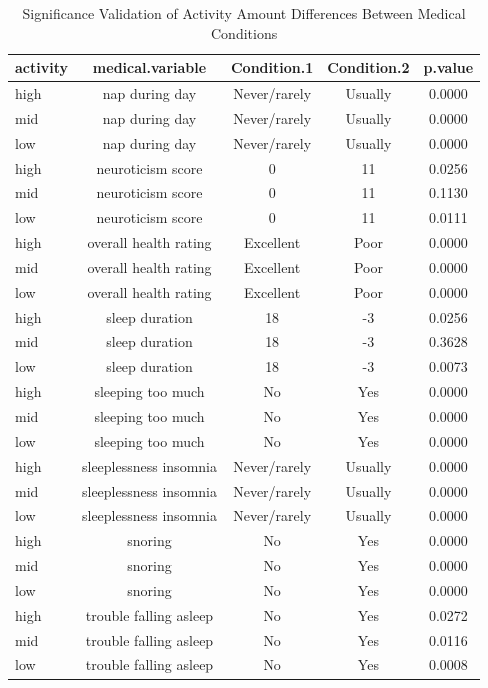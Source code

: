 \documentclass[12pt]{article}
\begin{document}
\begin{longtable}[t]{>{\centering\arraybackslash}p{2cm}cccc}
\caption{\label{tab:unnamed-chunk-8}Significance Validation of Activity Amount Differences Between Medical Conditions}\\
\toprule
activity & medical.variable & Condition.1 & Condition.2 & p.value\\
\midrule
high & nap during day & Never/rarely & Usually & 0.0000\\
mid & nap during day & Never/rarely & Usually & 0.0000\\
low & nap during day & Never/rarely & Usually & 0.0000\\
high & neuroticism score & 0 & 11 & 0.0256\\
mid & neuroticism score & 0 & 11 & 0.1130\\
\addlinespace
low & neuroticism score & 0 & 11 & 0.0111\\
high & overall health rating & Excellent & Poor & 0.0000\\
mid & overall health rating & Excellent & Poor & 0.0000\\
low & overall health rating & Excellent & Poor & 0.0000\\
high & sleep duration & 18 & -3 & 0.0256\\
\addlinespace
mid & sleep duration & 18 & -3 & 0.3628\\
low & sleep duration & 18 & -3 & 0.0073\\
high & sleeping too much & No & Yes & 0.0000\\
mid & sleeping too much & No & Yes & 0.0000\\
low & sleeping too much & No & Yes & 0.0000\\
\addlinespace
high & sleeplessness insomnia & Never/rarely & Usually & 0.0000\\
mid & sleeplessness insomnia & Never/rarely & Usually & 0.0000\\
low & sleeplessness insomnia & Never/rarely & Usually & 0.0000\\
high & snoring & No & Yes & 0.0000\\
mid & snoring & No & Yes & 0.0000\\
\addlinespace
low & snoring & No & Yes & 0.0000\\
high & trouble falling asleep & No & Yes & 0.0272\\
mid & trouble falling asleep & No & Yes & 0.0116\\
low & trouble falling asleep & No & Yes & 0.0008\\
\bottomrule
\end{longtable}



\end{document}
